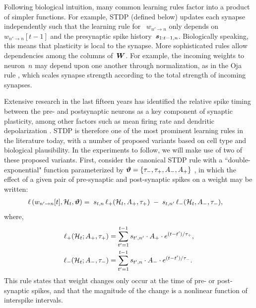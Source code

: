 Following biological intuition, many common learning rules factor into
a product of simpler functions. For example, STDP (defined below)
updates each synapse independently such that the learning rule for 
~$w_{n' \to n}$ only
depends on~${w_{n'\to n}[t-1]}$ and the presynaptic spike
history~${\boldsymbol{s}_{1:t-1,n}}$. Biologically speaking, this means that
plasticity is local to the synapse. More sophisticated rules allow
dependencies among the columns of~$\boldsymbol{W}$. For example, the incoming
weights to neuron~$n$ may depend upon one another through
normalization, as in the Oja rule \cite{Oja-1982}, which scales
synapse strength according to the total strength of incoming synapses.

\sloppy 
Extensive research in the last fifteen years has identified the
relative spike timing between the pre- and postsynaptic neurons as a
key component of synaptic plasticity, among other factors such as mean
firing rate and dendritic depolarization \cite{Feldman-2012}. STDP is
therefore one of the most prominent learning rules in the literature
today, with a number of proposed variants based on cell type and
biological plausibility. In the experiments to follow, we will make
use of two of these proposed variants. First, consider the canonical
STDP rule with a ``double-exponential" function parameterized by
${\boldsymbol{\vartheta} = \{\tau_-, \tau_+, A_-, A_+\}}$ \cite{Song-2000}, in which the
effect of a given pair of pre-synaptic and post-synaptic spikes on a
weight may be written:
\begin{align}
\label{eqn:AddSTDP}
 \ell\left(w_{n' \to n}[t], \mathcal{H}_t, \boldsymbol{\vartheta} \right) &= 
 \;s_{t,n} \, \ell_+(\mathcal{H}_t, A_+, \tau_+) 
 \;-\;s_{t,n'} \, \ell_-(\mathcal{H}_t, A_-, \tau_-),
\end{align}
where,
\begin{align*}
\ell_+(\mathcal{H}_t; A_+, \tau_+) &= \sum_{t'=1}^{t-1} s_{t', n'} \cdot  A_+ \cdot e^{(t-t')/\tau_+}, \\
\ell_-(\mathcal{H}_t; A_-, \tau_-) &= \sum_{t'=1}^{t-1} s_{t', n} \cdot  A_- \cdot e^{(t-t')/\tau_-}.
\end{align*}
This rule states that weight changes only occur at the time of pre- or
post-synaptic spikes, and that the magnitude of the change is a
nonlinear function of interspike intervals.

